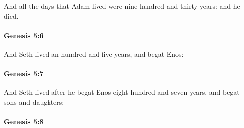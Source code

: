 			And all the days that Adam lived were nine hundred and thirty years: and he died.


		\paragraph{Genesis 5:6} %
			\label{GENESIS-5-6}

			And Seth lived an hundred and five years, and begat Enos:


		\paragraph{Genesis 5:7} %
			\label{GENESIS-5-7}

			And Seth lived after he begat Enos eight hundred and seven years, and begat sons and daughters:


		\paragraph{Genesis 5:8} %
			\label{GENESIS-5-8}

